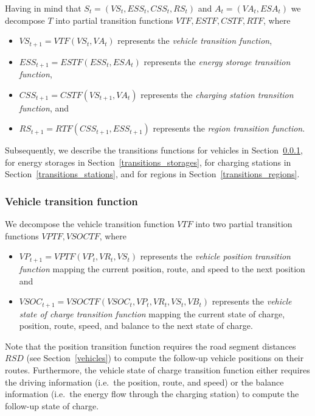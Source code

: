 Having in mind that $S_t = (VS_t, ESS_t, CSS_t, RS_t)$ and $A_t = (VA_t, ESA_t)$ we decompose $T$ into partial transition functions $VTF,ESTF,CSTF,RTF$, where
\begin{itemize}
	\item $VS_{t+1} = VTF(VS_t, VA_t)$ represents the \textit{vehicle transition function},
	\item $ESS_{t+1} = ESTF(ESS_t, ESA_t)$ represents the \textit{energy storage transition function},
	\item $CSS_{t+1} = CSTF(VS_{t+1}, VA_t)$ represents the \textit{charging station transition function}, and
	\item $RS_{t+1} = RTF(CSS_{t+1}, ESS_{t+1})$ represents the \textit{region transition function}.
\end{itemize}
Subsequently, we describe the transitions functions for vehicles in Section~\ref{transitions_vehicles}, for energy storages in Section~\ref{transitions_storages}, for charging stations in Section~\ref{transitions_stations}, and for regions in Section~\ref{transitions_regions}.  

\subsubsection{Vehicle transition function}
\label{transitions_vehicles}

We decompose the vehicle transition function $VTF$ into two partial transition functions $VPTF,VSOCTF$, where
\begin{itemize}
	\item $VP_{t+1} = VPTF(VP_t, VR_t, VS_t)$ represents the \textit{vehicle position transition function} mapping the current position, route, and speed to the next position and
	\item $VSOC_{t+1} = VSOCTF(VSOC_t, VP_t, VR_t, VS_t, VB_t)$ represents the \textit{vehicle state of charge transition function} mapping the current state of charge, position, route, speed, and balance to the next state of charge.
\end{itemize}
Note that the position transition function requires the road segment distances $RSD$ (see Section~\ref{vehicles}) to compute the follow-up vehicle positions on their routes. Furthermore, the vehicle state of charge transition function either requires the driving information (i.e.\ the position, route, and speed) or the balance information (i.e.\ the energy flow through the charging station) to compute the follow-up state of charge.

